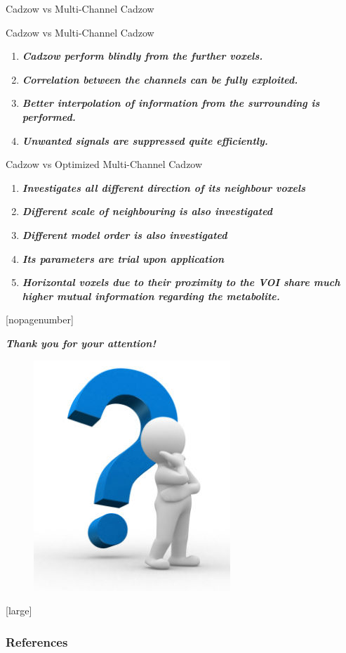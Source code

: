 \documentclass[t,12pt,english
\ifx\beamermode\undefined\else,\beamermode\fi
]{beamer}
\newcommand{\largefooter}{\setbeamertemplate{footline}[large]}
\newcommand{\emptyfooter}{\setbeamertemplate{footline}[nopagenumber]}
\begin{document}
\begin{frame}{Cadzow vs Multi-Channel Cadzow}

\begin{block}{\footnotesize{Cadzow vs Multi-Channel Cadzow}}\tiny{}
\begin{enumerate} 
\vspace{0.05cm}
    \item \tiny{\textbf{\textit{Cadzow perform blindly from the further voxels.}}}
    \item \tiny{\textbf{\textit{Correlation between the channels can be fully exploited.}}}
    \item \tiny{\textbf{\textit{Better interpolation of information from the surrounding is performed.}}}
    \item \tiny{\textbf{\textit{Unwanted signals are suppressed quite efficiently.}}}

     
\end{enumerate}
\end{block}

\begin{block}{\footnotesize{Cadzow vs Optimized Multi-Channel Cadzow}}\tiny{}
\begin{enumerate} 
\vspace{0.05cm}
     
    \item \tiny{\textbf{\textit{Investigates all different direction of its neighbour voxels}}}
    \item \tiny{\textbf{\textit{Different scale of neighbouring is also investigated}}}
    \item \tiny{\textbf{\textit{Different model order is also investigated}}}
    \item \tiny{\textbf{\textit{Its parameters are trial upon application}}}
    \item \tiny{\textbf{\textit{Horizontal voxels due to their proximity to the VOI share much higher mutual information regarding the metabolite.}}}
     
\end{enumerate}
\end{block}

\end{frame}






\emptyfooter
\begin{frame}{ }
\centering \textbf{\Large \textit{Thank you for your attention!}}
\begin{figure}[!htb]
\includegraphics[width=.3\textwidth]{QA.jpg}
\end{figure}
\largefooter
\end{frame}




\begin{frame}[allowframebreaks]
        \frametitle{References}
        \nocite{*}
        
        
\end{frame}
\end{document}
